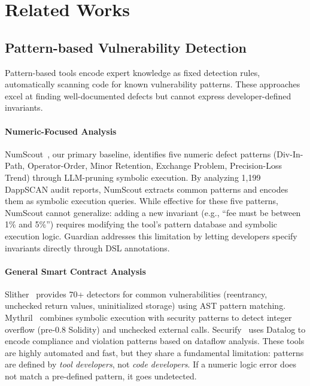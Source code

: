 \documentclass[pdflatex,sn-basic]{sn-jnl}%
\theoremstyle{thmstyleone}%
\theoremstyle{thmstyletwo}%
\theoremstyle{thmstylethree}%
\begin{document}
\section{Related Works}

%

\subsection{Pattern-based Vulnerability Detection}

Pattern-based tools encode expert knowledge as fixed detection rules, automatically scanning code for known vulnerability patterns. These approaches excel at finding well-documented defects but cannot express developer-defined invariants.

\paragraph{Numeric-Focused Analysis}
NumScout~\citep{numscout}, our primary baseline, identifies five numeric defect patterns (Div-In-Path, Operator-Order, Minor Retention, Exchange Problem, Precision-Loss Trend) through LLM-pruning symbolic execution. By analyzing 1,199 DappSCAN audit reports, NumScout extracts common patterns and encodes them as symbolic execution queries. While effective for these five patterns, NumScout cannot generalize: adding a new invariant (e.g., ``fee must be between 1\% and 5\%'') requires modifying the tool's pattern database and symbolic execution logic. Guardian addresses this limitation by letting developers specify invariants directly through DSL annotations.

\paragraph{General Smart Contract Analysis}
Slither~\citep{slither} provides 70+ detectors for common vulnerabilities (reentrancy, unchecked return values, uninitialized storage) using AST pattern matching. Mythril~\citep{mythril} combines symbolic execution with security patterns to detect integer overflow (pre-0.8 Solidity) and unchecked external calls. Securify~\citep{securify} uses Datalog to encode compliance and violation patterns based on dataflow analysis. These tools are highly automated and fast, but they share a fundamental limitation: patterns are defined by \textit{tool developers}, not \textit{code developers}. If a numeric logic error does not match a pre-defined pattern, it goes undetected.
\end{document}
